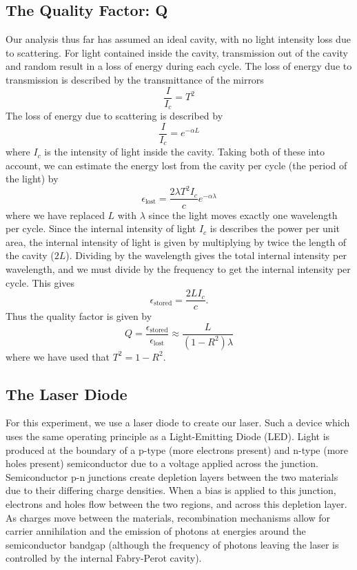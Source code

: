 \documentclass[twocolumn,amsmath,amssymb,pra]{revtex4-2}
\newcommand{\eq}[1]{\begin{equation}#1\end{equation}}
\newcommand{\sub}[1]{_\textrm{#1}}
\begin{document}
\subsection{The Quality Factor: Q}
Our analysis thus far has assumed an ideal cavity, with no light intensity loss due to scattering. For light contained inside the cavity, transmission out of the cavity and random result in a loss of energy during each cycle. The loss of energy due to transmission is described by the transmittance of the mirrors
\eq{ 
    \frac{I}{I_c} = T^2
}
The loss of energy due to scattering is described by 
\eq{ 
    \frac{I}{I_c} = e^{-\alpha L}
}
where $I_c$ is the intensity of light inside the cavity. Taking both of these into account, we can estimate the energy lost from the cavity per cycle (the period of the light) by
\eq{
    \epsilon\sub{lost} = \frac{2\lambda{} T^2 I_c}{c}e^{-\alpha\lambda}
}
where we have replaced $L$ with $\lambda$ since the light moves exactly one wavelength per cycle. Since the internal intensity of light $I_c$ is describes the power per unit area, the internal intensity of light is given by multiplying by twice the length of the cavity ($2L$). Dividing by the wavelength gives the total internal intensity per wavelength, and we must divide by the frequency to get the internal intensity per cycle. This gives
\eq{
     \epsilon\sub{stored} = \frac{2L I_c}{c}.
}
Thus the quality factor is given by 
\eq{ 
    Q = \frac{\epsilon\sub{stored}}{\epsilon\sub{lost}} \approx \frac{L}{(1-R^2)\lambda}
}
where we have used that $T^2 = 1 - R^2$.


\subsection{The Laser Diode}
For this experiment, we use a laser diode to create our laser. Such a device which uses the same operating principle as a Light-Emitting Diode (LED). Light is produced at the boundary of a p-type (more electrons present) and n-type (more holes present) semiconductor due to a voltage applied across the junction. Semiconductor p-n junctions create depletion layers between the two materials due to their differing charge densities. When a bias is applied to this junction, electrons and holes flow between the two regions, and across this depletion layer. As charges move between the materials, recombination mechanisms allow for carrier annihilation and the emission of photons at energies around the semiconductor bandgap (although the frequency of photons leaving the laser is controlled by the internal Fabry-Perot cavity). 
\end{document}
